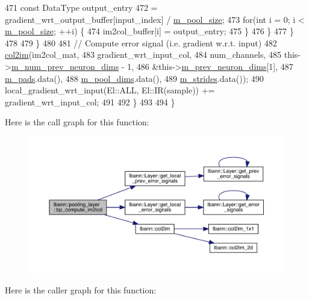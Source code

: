 \begin{DoxyCode}
471             \textcolor{keyword}{const} DataType output\_entry
472               = gradient\_wrt\_output\_buffer[input\_index] / \hyperlink{classlbann_1_1pooling__layer_a8b3a9020bb896a1132c9823bc2c73515}{m\_pool\_size};
473             \textcolor{keywordflow}{for}(\textcolor{keywordtype}{int} i = 0; i < \hyperlink{classlbann_1_1pooling__layer_a8b3a9020bb896a1132c9823bc2c73515}{m\_pool\_size}; ++i) \{
474               im2col\_buffer[i] = output\_entry;
475             \}
476           \}
477         \}
478 
479       \}
480 
481       \textcolor{comment}{// Compute error signal (i.e. gradient w.r.t. input)}
482       \hyperlink{namespacelbann_a0e1225f72580ffb5166181392b68b651}{col2im}(im2col\_mat,
483              gradient\_wrt\_input\_col,
484              num\_channels,
485              this->\hyperlink{classlbann_1_1Layer_adc052afb38f170e839db00d3c8151d1e}{m\_num\_prev\_neuron\_dims} - 1,
486              &this->\hyperlink{classlbann_1_1Layer_ae204d1a2a79606eaa117273857ff62a3}{m\_prev\_neuron\_dims}[1],
487              \hyperlink{classlbann_1_1pooling__layer_a22fd39aa4358149110a369ddf0e5ffdb}{m\_pads}.data(),
488              \hyperlink{classlbann_1_1pooling__layer_abb52fe974f602921823a46320fd7d075}{m\_pool\_dims}.data(),
489              \hyperlink{classlbann_1_1pooling__layer_a754bb6d49b39e915f315ca0049c953d9}{m\_strides}.data());
490       local\_gradient\_wrt\_input(El::ALL, El::IR(sample)) += gradient\_wrt\_input\_col;
491 
492     \}
493 
494   \}
\end{DoxyCode}
Here is the call graph for this function\+:\nopagebreak
\begin{figure}[H]
\begin{center}
\leavevmode
\includegraphics[width=350pt]{classlbann_1_1pooling__layer_a704aca0e1e5bba7d27b7755133e6d50b_cgraph}
\end{center}
\end{figure}
Here is the caller graph for this function\+:\nopagebreak
